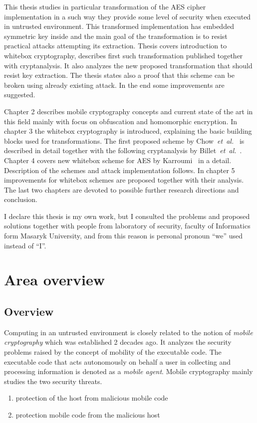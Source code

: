 \documentclass[11pt,oneside,final]{fithesis2}
\newcommand{\eal}{\emph{et~al.}}
\begin{document}
    This thesis studies in particular transformation of the AES cipher \citep{2002-daemen} implementation in a such way they provide some
    level of security when executed in untrusted environment. This transformed implementation has embedded symmetric key inside
    and the main goal of the transformation is to resist practical attacks attempting its extraction. Thesis covers introduction
    to whitebox cryptography, describes first such transformation published together with cryptanalysis. It also analyzes the new 
    proposed transformation that should resist key extraction. The thesis states also a proof that this scheme can be broken 
    using already existing attack. In the end some improvements are suggested.

    Chapter 2 describes mobile cryptography concepts and current state of the art in this field mainly with focus on obfuscation and homomorphic encryption.
    In chapter 3 the whitebox cryptography is introduced, explaining the basic building blocks used for transformations. The first proposed scheme 
    by Chow~\eal~\citep{Chow02white-boxcryptography} is described in detail together with the following cryptanalysis by Billet~\eal~\citep{Billet:2004:CWB:2080787.2080809}.
    Chapter 4 covers new whitebox scheme for AES by Karroumi~\citep{Karroumi:2010:PWA:2041036.2041060} in a detail. 
    Description of the schemes and attack implementation follows. 
    In chapter 5 improvements for whitebox schemes are proposed together with their analysis. The last two chapters are devoted to possible further 
    research directions and conclusion.

    I declare this thesis is my own work, but I consulted the problems and proposed solutions together with people from laboratory of security, 
    faculty of Informatics form Masaryk University, and from this reason is personal pronoun ``we'' used instead of ``I''.

\chapter{Area overview}\label{sec:theory}
    
    \section{Overview}
    Computing in an untrusted environment is closely related to the notion of \emph{mobile cryptography} \citep{mobile_cryptography} which was established 2 decades ago.
    It analyzes the security problems raised by the concept of mobility of the executable code. The executable code that acts autonomously on behalf a user in collecting 
    and processing information is denoted as a \emph{mobile agent}. Mobile cryptography mainly studies the two security threats.
    \begin{enumerate}
     \item protection of the host from malicious mobile code
     \item protection mobile code from the malicious host
    \end{enumerate}
    
\end{document}
